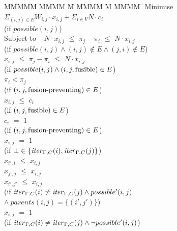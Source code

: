 \begin{tabbing}
MMMMM   \= MMMM \= M \= MMMM \= M \= MMMM \= \kill
Minimise   \> $\Sigma_{(i,j) \in E} W_{i,j} \cdot x_{i,j} + \Sigma_{i \in V} N \cdot c_i$  \\
           \> (if $possible(i,j)$)         
\\[1ex]
Subject to \> $-N \cdot x_{i,j}$ \> $\le$ \> $\pi_j - \pi_i$ \> $\le$ \> $N \cdot x_{i,j}$ \\
           \> (if $possible(i,j) \wedge (i,j) \not\in E \wedge (j,i) \not\in E$)            
\\[1ex]
           \>    $x_{i,j}$ \> $\le$ \> $\pi_j - \pi_i$ \> $\le$ \> $N \cdot x_{i,j}$ \\
           \> (if $possible(i,j) \wedge (i,j,\mathrm{fusible}) \in E$)     
\\[1ex]
           \>             \>       \> $\pi_i < \pi_j$ \>       \>            \\
           \> (if $(i,j,\mbox{fusion-preventing}) \in E$)    
\\[1ex]
           \> $x_{i,j}$    \> $\le$ \> $c_i$           \>       \>            \\
           \> (if $(i,j, \mathrm{fusible}) \in E$) \\
           \> $c_{i }$    \> $ = $ \> $ 1 $           \>       \>            \\
           \> (if $(i,j, \mbox{fusion-preventing}) \in E$)
\\[1ex]
           \> $x_{i,j}$    \> $=$   \> $1$             \>       \>            \\
           \> (if $\bot \in \{\mathit{iter}_{\Gamma,C}(i), \mathit{iter}_{\Gamma,C}(j)\}$)  
\\[1ex]
           \> $x_{i',i}$   \> $\le$ \> $x_{i,j}$        \>       \>            \\
           \> $x_{j',j}$   \> $\le$ \> $x_{i,j}$        \>       \>            \\
           \> $x_{i',j'}$   \> $\le$ \> $x_{i,j}$        \>       \>            \\
           \> (if $\mathit{iter}_{\Gamma,C}(i) \not= \mathit{iter}_{\Gamma,C}(j) \wedge possible'(i,j)$ \\
           \> \> $\wedge~parents(i,j) = \{(i',j')\}$) 
\\[1ex]
           \> $x_{i,j}$    \> $=$   \> $1$             \>       \>            \\
           \> (if $\mathit{iter}_{\Gamma,C}(i) \not= \mathit{iter}_{\Gamma,C}(j) \wedge \neg possible'(i,j)$) 
\\[1ex]

\end{tabbing}
